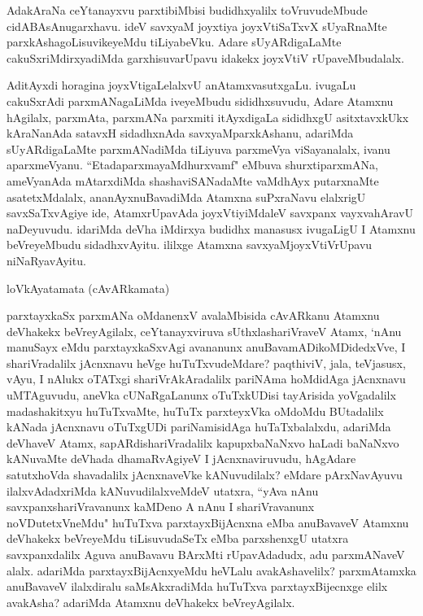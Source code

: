 \begin{artha}
AdakAraNa ceYtanayxvu parxtibiMbisi budidhxyalilx toVruvudeMbude cidABAsAnugarxhavu. ideV savxyaM joyxtiya joyxVtiSaTxvX sUyaRnaMte parxkAshagoLisuvikeyeMdu tiLiyabeVku. Adare sUyARdigaLaMte cakuSxriMdirxyadiMda garxhisuvarUpavu idakekx joyxVtiV rUpaveMbudalalx. 
\end{artha}

\begin{artha}
AditAyxdi horagina joyxVtigaLelalxvU anAtamxvasutxgaLu. ivugaLu cakuSxrAdi parxmANagaLiMda iveyeMbudu sididhxsuvudu, Adare Atamxnu hAgilalx, parxmAta, parxmANa parxmiti itAyxdigaLa sididhxgU asitxtavxkUkx kAraNanAda satavxH sidadhxnAda savxyaMparxkAshanu, adariMda sUyARdigaLaMte parxmANadiMda tiLiyuva parxmeVya viSayanalalx, ivanu aparxmeVyanu. ``EtadaparxmayaMdhurxvamf" eMbuva shurxtiparxmANa, ameVyanAda mAtarxdiMda shashaviSANadaMte vaMdhAyx putarxnaMte asatetxMdalalx, ananAyxnuBavadiMda Atamxna suPxraNavu elalxrigU savxSaTxvAgiye ide, AtamxrUpavAda joyxVtiyiMdaleV savxpanx vayxvahAravU naDeyuvudu. idariMda deVha iMdirxya budidhx manasusx ivugaLigU I Atamxnu beVreyeMbudu sidadhxvAyitu. ililxge Atamxna savxyaMjoyxVtiVrUpavu niNaRyavAyitu.
\end{artha}

\begin{center}%
loVkAyatamata (cAvARkamata)
\end{center}

\begin{artha}
parxtayxkaSx parxmANa oMdanenxV avalaMbisida cAvARkanu Atamxnu deVhakekx beVreyAgilalx, ceYtanayxviruva sUthxlashariVraveV Atamx, `nAnu manuSayx eMdu parxtayxkaSxvAgi avananunx anuBavamADikoMDidedxVve, I shariVradalilx jAcnxnavu heVge huTuTxvudeMdare? paqthiviV, jala, teVjasusx, vAyu, I nAlukx oTATxgi shariVrAkAradalilx pariNAma hoMdidAga jAcnxnavu uMTAguvudu, aneVka cUNaRgaLanunx oTuTxkUDisi tayArisida yoVgadalilx madashakitxyu huTuTxvaMte, huTuTx parxteyxVka oMdoMdu BUtadalilx kANada jAcnxnavu oTuTxgUDi pariNamisidAga huTaTxbalalxdu, adariMda deVhaveV Atamx, sapARdishariVradalilx kapupxbaNaNxvo haLadi baNaNxvo kANuvaMte deVhada dhamaRvAgiyeV I jAcnxnaviruvudu, hAgAdare satutxhoVda shavadalilx jAcnxnaveVke kANuvudilalx? eMdare pArxNavAyuvu ilalxvAdadxriMda kANuvudilalxveMdeV utatxra, ``yAva nAnu savxpanxshariVravanunx kaMDeno A nAnu I shariVravanunx noVDutetxVneMdu" huTuTxva parxtayxBijAcnxna eMba anuBavaveV Atamxnu deVhakekx beVreyeMdu tiLisuvudaSeTx eMba parxshenxgU utatxra savxpanxdalilx Aguva anuBavavu BArxMti rUpavAdadudx, adu parxmANaveV alalx. adariMda parxtayxBijAcnxyeMdu heVLalu avakAshavelilx? parxmAtamxka anuBavaveV ilalxdiralu saMsAkxradiMda huTuTxva parxtayxBijecnxge elilx avakAsha? adariMda Atamxnu deVhakekx beVreyAgilalx. 
\end{artha}

